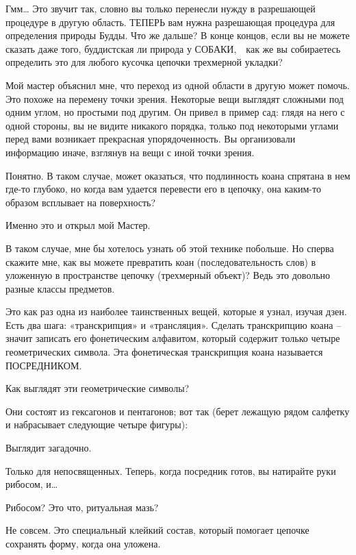 \documentclass[../main.tex]{subfiles}
\begin{document}
\begin{dialogue}
 Гмм\ldots{} Это звучит так, словно вы только перенесли нужду в разрешающей процедуре в другую область. ТЕПЕРЬ вам нужна разрешающая процедура для определения природы Будды. Что же дальше? В конце концов, если вы не можете сказать даже того, буддистская ли природа у СОБАКИ,~~как же вы собираетесь определить это для любого кусочка цепочки трехмерной укладки?

 Мой мастер объяснил мне, что переход из одной области в другую может помочь. Это похоже на перемену точки зрения. Некоторые вещи выглядят сложными под одним углом, но простыми под другим. Он привел в пример сад: глядя на него с одной стороны, вы не видите никакого порядка, только под некоторыми углами перед вами возникает прекрасная упорядоченность. Вы организовали информацию иначе, взглянув на вещи с иной точки зрения.

 Понятно. В таком случае, может оказаться, что подлинность коана спрятана в нем где-то глубоко, но когда вам удается перевести его в цепочку, она каким-то образом всплывает на поверхность?

 Именно это и открыл мой Мастер.

 В таком случае, мне бы хотелось узнать об этой технике побольше. Но сперва скажите мне, как вы можете превратить коан (последовательность слов) в уложенную в пространстве цепочку (трехмерный объект)? Ведь это довольно разные классы предметов.

 Это как раз одна из наиболее таинственных вещей, которые я узнал, изучая дзен. Есть два шага: «транскрипция» и «трансляция». Сделать транскрипцию коана \--- значит записать его фонетическим алфавитом, который содержит только четыре геометрических символа. Эта фонетическая транскрипция коана называется ПОСРЕДНИКОМ.

 Как выглядят эти геометрические символы?

 Они состоят из гексагонов и пентагонов; вот так (берет лежащую рядом салфетку и набрасывает следующие четыре фигуры):

 Выглядит загадочно.

 Только для непосвященных. Теперь, когда посредник готов, вы натирайте руки рибосом, и\ldots{}

 Рибосом? Это что, ритуальная мазь?

 Не совсем. Это специальный клейкий состав, который помогает цепочке сохранять форму, когда она уложена.


\end{dialogue}
\end{document}
